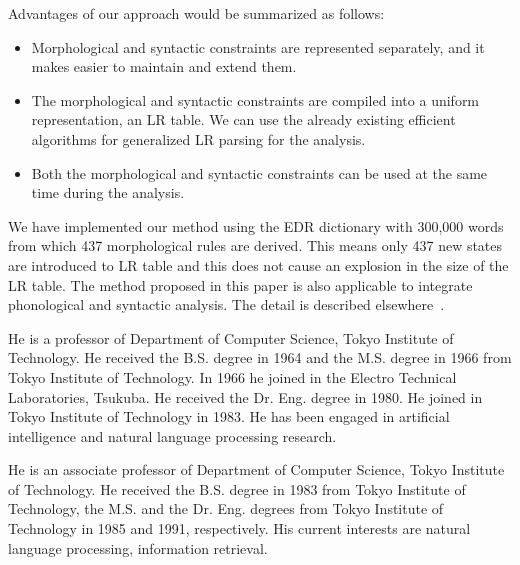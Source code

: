 Advantages of our approach would be summarized as follows:
\begin{itemize}
    \item Morphological and syntactic constraints are represented
    separately, and it makes easier to maintain and extend them.

    \item The morphological and syntactic constraints are compiled into a
    uniform representation, an LR table. We can use the already
    existing efficient algorithms for generalized LR parsing for the
    analysis. 

    \item Both the morphological and syntactic constraints can be used
        at the same time during the analysis. 
\end{itemize}

We have implemented our method using the EDR dictionary with 300,000
words~\cite{edr:93:a} from which 437 morphological rules are derived. 
This means only 437 new states are introduced to LR table and this
does not cause an explosion in the size of the LR table.  The method
proposed in this paper is also applicable to integrate phonological
and syntactic analysis. The detail is described
elsewhere~\cite{tanaka:94:e}.





\begin{biography}

\biotitle{}

 {He is a professor of Department of Computer
  Science, Tokyo Institute of Technology. He received the B.S. degree
  in 1964 and the M.S. degree in 1966 from Tokyo Institute of
  Technology. In 1966 he joined in the Electro Technical Laboratories,
  Tsukuba. He received the Dr. Eng. degree in 1980. He joined in Tokyo
  Institute of Technology in 1983. He has been engaged in artificial
  intelligence and natural language processing research.  }

 {He is an associate professor of
  Department of Computer Science, Tokyo Institute of Technology. He
  received the B.S.  degree in 1983 from Tokyo Institute of
  Technology, the M.S. and the Dr. Eng. degrees from Tokyo Institute
  of Technology in 1985 and 1991, respectively. His current interests
  are natural language processing, information retrieval.}



\end{biography}



